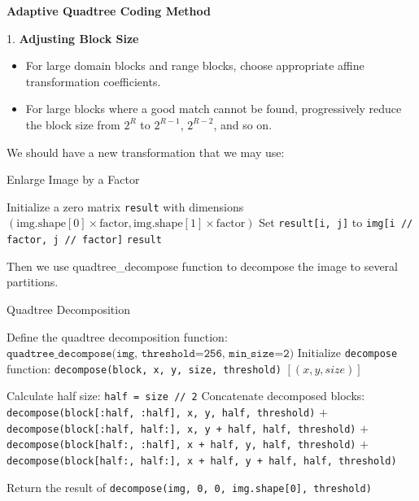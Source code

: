 \documentclass[a4paper,11pt, titlepage]{article}
\theoremstyle{definition}
\theoremstyle{plain}
\theoremstyle{remark}
\theoremstyle{definition}
\begin{document}
\textbf{Adaptive Quadtree Coding Method}\cite{128028}\cite{Fisher1995}

1. \textbf{Adjusting Block Size}
   \begin{itemize}
       \item For large domain blocks and range blocks, choose appropriate affine transformation coefficients.
       \item For large blocks where a good match cannot be found, progressively reduce the block size from \( 2^R \) to \( 2^{R-1} \), \( 2^{R-2} \), and so on.
   \end{itemize}

We should have a new transformation that we may use:


\begin{algorithm}
\caption{Enlarge Image by a Factor}
\begin{algorithmic}[1]
\STATE Initialize a zero matrix \texttt{result} with dimensions $(\text{img.shape}[0] \times \text{factor}, \text{img.shape}[1] \times \text{factor})$
        \STATE Set \texttt{result[i, j]} to \texttt{img[i // factor, j // factor]}
    \ENDFOR
\ENDFOR
\RETURN \texttt{result}
\end{algorithmic}
\end{algorithm}

Then we use quadtree\_decompose function to decompose the image to several partitions.

\begin{algorithm}
\caption{Quadtree Decomposition}
\begin{algorithmic}[1]
\STATE Define the quadtree decomposition function:
\STATE $\texttt{quadtree\_decompose(img, threshold=256, min\_size=2)}$
\STATE Initialize \texttt{decompose} function: \quad \texttt{decompose(block, x, y, size, threshold)}
    \RETURN $[(x, y, size)]$
\ENDIF

\STATE Calculate half size: \quad \texttt{half = size // 2}
\RETURN Concatenate decomposed blocks:
\STATE \quad \texttt{decompose(block[:half, :half], x, y, half, threshold)} $+$
\STATE \quad \texttt{decompose(block[:half, half:], x, y + half, half, threshold)} $+$
\STATE \quad \texttt{decompose(block[half:, :half], x + half, y, half, threshold)} $+$
\STATE \quad \texttt{decompose(block[half:, half:], x + half, y + half, half, threshold)}

\STATE Return the result of \texttt{decompose(img, 0, 0, img.shape[0], threshold)}

\end{algorithmic}
\end{algorithm}
\end{document}
